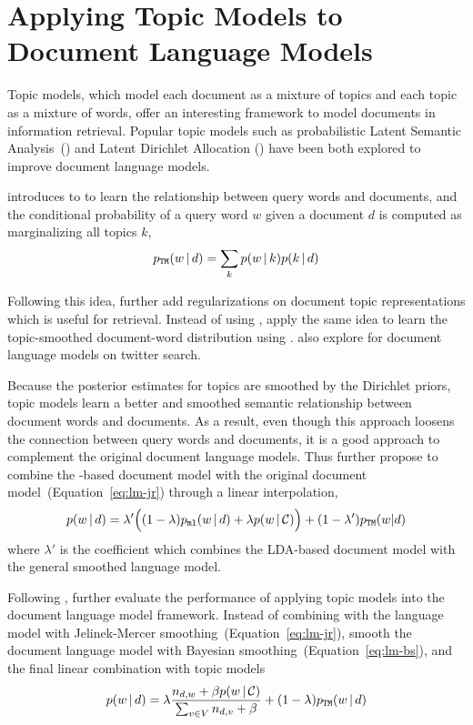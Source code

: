 \section{Applying Topic Models to Document Language Models}

Topic models, which model each document as a mixture of topics and
each topic as a mixture of words, offer an interesting framework to
model documents in information retrieval. Popular topic models such as
probabilistic Latent Semantic Analysis~(\plsa{}) and Latent Dirichlet Allocation ()
have been both explored to improve document language models.

\citet{hofmann-99a} introduces \plsa{} to
to learn the relationship between query words and documents,
and the conditional probability of a query word $w$ given a document $d$ is
computed as marginalizing all topics $k$,
\begin{align}
p_{\texttt{TM}}(w \, | \, d) = \sum_{k} p(w \, | \, k) p(k \, | \, d)
\end{align}

Following this idea, \citet{Wang-2013} further add regularizations  on document topic representations 
which is useful for retrieval. Instead of using , \citet{wei-06} apply the same idea to 
learn the topic-smoothed document-word distribution using .
\citet{Vosecky-2014} also explore  for document language models on  twitter search.

Because the posterior estimates for topics are smoothed by the Dirichlet priors, topic models learn a better and
smoothed semantic relationship between document words and documents. As a result,
even though this approach loosens the connection between query words and documents,
it is a good approach to complement the original document language models. 
Thus \citet{wei-06} further propose to combine the
-based document model with the original document
model~(Equation~\ref{eq:lm-jr}) through a linear interpolation,
\begin{align}
p(w \, | \, d) = \lambda' \Big( (1 - \lambda) p_{\texttt{ml}}(w \, | \, d) + \lambda
p(w \, | \, \mathcal{C}) \Big) + (1 - \lambda') p_{\texttt{TM}}(w|d)
\end{align}
where $\lambda'$ is the coefficient which combines the LDA-based
document model with the general smoothed language model.

Following \citet{wei-06}, \citet{Lu-2011} further evaluate the
performance of applying topic models into the document language model
framework. Instead of combining with the language model with
Jelinek-Mercer smoothing~(Equation~\ref{eq:lm-jr}), \citet{Lu-2011}
smooth the document language model with Bayesian
smoothing~(Equation~\ref{eq:lm-bs}), and the final linear combination
with topic models
\begin{align}
p(w \, | \, d) = \lambda \frac{n_{d,w} + \beta p(w \, | \, \mathcal{C})}{\sum_{v
  \in V} n_{d,v} + \beta}  + (1 - \lambda) p_{\texttt{TM}}(w \, | \, d)
\end{align}

